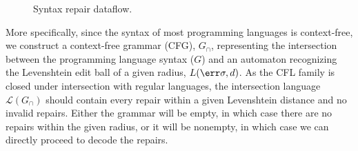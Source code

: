 \documentclass[runningheads]{llncs}
\begin{document}
\begin{wrapfigure}{r}{0.4\textwidth}
\begin{center}
{
      }
    \end{center}
    \vspace{-0.2cm}
    \caption{Syntax repair dataflow.}\label{fig:flowchart}
    \vspace{-1cm}
  \end{wrapfigure}

  More specifically, since the syntax of most programming languages is context-free, we construct a context-free grammar (CFG), $G_\cap$, representing the intersection between the programming language syntax ($G$) and an automaton recognizing the Levenshtein edit ball of a given radius, $L(\err\sigma, d)$. As the CFL family is closed under intersection with regular languages, the intersection language $\mathcal{L}(G_\cap)$ should contain every repair within a given Levenshtein distance and no invalid repairs. Either the grammar will be empty, in which case there are no repairs within the given radius, or it will be nonempty, in which case we can directly proceed to decode the repairs.

\end{document}

